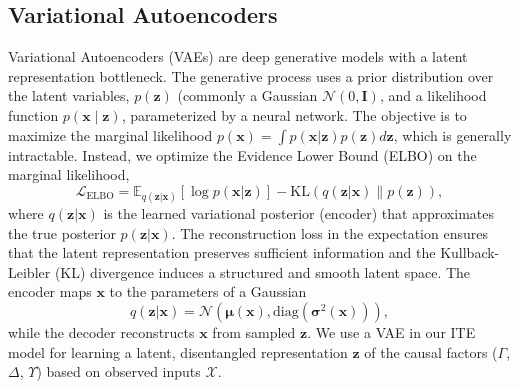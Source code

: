 \documentclass[doubleblind]{ecai}
\begin{document}
	
	
	\subsection{Variational Autoencoders}
	\label{sec:background-vae}
	
	Variational Autoencoders (VAEs) \citep{VAE} are deep generative models with a latent representation bottleneck. %
	The generative process uses a prior distribution over the latent variables, $p(\mathbf{z})$ (commonly a Gaussian $\mathcal{N}(0, \mathbf{I})$, and a likelihood function $p(\mathbf{x} \mid \mathbf{z})$, parameterized by a neural network. The objective is to maximize the marginal likelihood
	$ p(\mathbf{x})  =  \int p(\mathbf{x} | \mathbf{z}) p(\mathbf{z}) d\mathbf{z}$, which is generally intractable.
	Instead, we optimize the Evidence Lower Bound (ELBO) on the marginal likelihood,
	\begin{equation}
		\mathcal{L}_{\text{ELBO}} 
		= 
		\mathbb{E}_{q(\mathbf{z}|\mathbf{x})} [\log p(\mathbf{x} | \mathbf{z})] - \text{KL}(q(\mathbf{z}|\mathbf{x}) \| p(\mathbf{z})),
		\label{eq:elbo}
	\end{equation}
	where $q(\mathbf{z} | \mathbf{x})$ is the learned variational posterior (encoder) that approximates the true posterior $p(\mathbf{z} | \mathbf{x})$. The reconstruction loss in the expectation ensures that the latent representation preserves sufficient information and the Kullback-Leibler (KL) divergence induces a structured and smooth latent space.
	The encoder maps $\mathbf{x}$ to the parameters of a Gaussian
	\begin{equation}
		q(\mathbf{z}|\mathbf{x}) = \mathcal{N}(\boldsymbol{\mu}(\mathbf{x}), \text{diag}(\boldsymbol{\sigma}^2(\mathbf{x}))),
	\end{equation}
	while the decoder reconstructs $\mathbf{x}$ from sampled $\mathbf{z}$. %
	We use a VAE in our ITE model for learning a latent, disentangled representation $\mathbf{z}$ of the causal factors ($\Gamma$, $\Delta$, $\Upsilon$) based on observed inputs $\mathcal{X}$.
	
\end{document}
